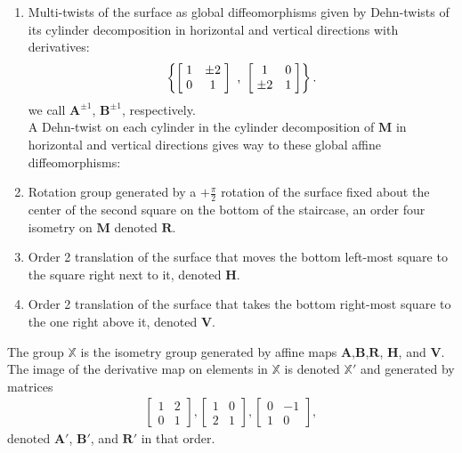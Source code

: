 \documentclass[]{article}
\begin{document}
\begin{enumerate}[label=(\roman*)]
\item Multi-twists of the surface as global diffeomorphisms given by Dehn-twists of its cylinder decomposition in horizontal and vertical directions with derivatives:
\begin{equation*}
\left\{ \left[ \hspace{1mm} \begin{matrix}
				1 &  \pm 2\\
				0 & 1
			\end{matrix}\hspace{1mm}\right] \text{ , }
			\left[ \hspace{1mm} \begin{matrix}
							1 & 0\\
							 \pm 2 & 1
						\end{matrix}\hspace{1mm}\right] \right\}.
\end{equation*}
we call $\mathbf{A}^{\pm 1}$, $\mathbf{B}^{\pm 1}$, respectively.\\
A Dehn-twist on each cylinder in the cylinder decomposition of $\mathbf{M}$ in horizontal and vertical directions gives way to these global affine diffeomorphisms:


\item Rotation group generated by a $+\frac{\pi}{2}$ rotation of the surface fixed about the center of the second square on the bottom of the staircase, an order four isometry on $\mathbf{M}$ denoted $\mathbf{R}$.

\item  Order 2 translation of the surface that moves the bottom left-most square to the square right next to it, denoted $\mathbf{H}$.
\item Order 2 translation of the surface that takes the bottom right-most square to the one right above it, denoted $\mathbf{V}$.
\end{enumerate}

\begin{Def}
The group $\mathbb{X}$ is the isometry group generated by affine maps $\mathbf{A}$,$\mathbf{B}$,$\mathbf{R}$, $\mathbf{H}$, and $\mathbf{V}$. The image of the derivative map on elements in $\mathbb{X}$ is denoted $\mathbb{X}'$ and generated by matrices
\begin{align*}
\left[\begin{matrix}
1 & 2 \\ 0 & 1
\end{matrix}\right],
\left[\begin{matrix}
1 & 0 \\ 2 & 1
\end{matrix}\right],
\left[\begin{matrix}
0 & -1 \\ 1 & 0
\end{matrix}\right],
\end{align*}
denoted $\mathbf{A}'$, $\mathbf{B}'$, and $\mathbf{R}'$ in that order.
\end{Def}
\end{document}
